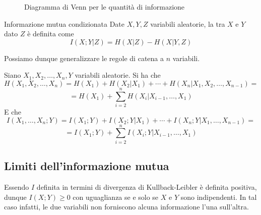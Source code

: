 \begin{figure}[H]
  \centering
  \caption{Diagramma di Venn per le quantità di informazione}\label{fig:venn_info}
\end{figure}

\begin{definition}{Informazione mutua condizionata}
  Date \(X,Y,Z\) variabili aleatorie, la  tra \(X\) e \(Y\) dato \(Z\) è definita come
  \[I(X;Y|Z) = H(X|Z) - H(X|Y,Z)\]
\end{definition}

Possiamo dunque generalizzare le regole di catena a \(n\) variabili.

\begin{proposition}{}
  Siano \(X_1, X_2, \ldots, X_n, Y\) variabili aleatorie.
  Si ha che
  \[H(X_1, X_2, \ldots, X_n) = H(X_1) + H(X_2|X_1) + \cdots + H(X_n | X_1, X_2, \ldots, X_{n-1}) = \]
  \[=H(X_1) + \sum_{i=2}^{n} H(X_i | X_{i-1}, \ldots, X_1)\]
  E che
  \[I(X_1, \ldots, X_n; Y) = I(X_1; Y) + I(X_2; Y | X_1) + \cdots + I(X_n; Y | X_1, \ldots, X_{n-1}) = \]
  \[=I(X_1;Y) + \sum_{i=2}^{n} I(X_i; Y | X_{i-1}, \ldots, X_1)\]
\end{proposition}

\subsection{Limiti dell'informazione mutua}\label{subs:mutual_information_limits}

Essendo \(I\) definita in termini di divergenza di Kullback-Leibler è definita positiva, dunque \(I(X;Y) \geq 0\) con uguaglianza se e solo se \(X\) e \(Y\) sono indipendenti.
In tal caso infatti, le due variabili non forniscono alcuna informazione l'una sull'altra.

